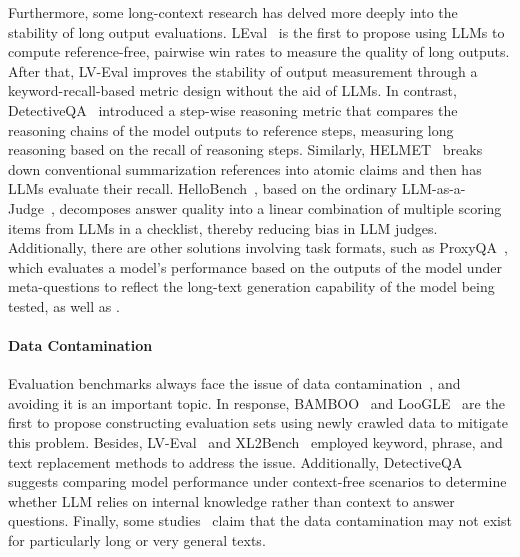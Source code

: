 Furthermore, some long-context research has delved more deeply into the stability of long output evaluations. LEval~\citep{an2023eval} is the first to propose using LLMs to compute reference-free, pairwise win rates to measure the quality of long outputs. After that, LV-Eval\cite{yuan2024lv} improves the stability of output measurement through a keyword-recall-based metric design without the aid of LLMs. In contrast, DetectiveQA~\citep{xu2024detectiveqa} introduced a step-wise reasoning metric that compares the reasoning chains of the model outputs to reference steps, measuring long reasoning based on the recall of reasoning steps. Similarly, HELMET~\citep{yen2024helmet} breaks down conventional summarization references into atomic claims and then has LLMs evaluate their recall. HelloBench~\citep{que2024hellobench}, based on the ordinary LLM-as-a-Judge~\citep{zheng2023judging}, decomposes answer quality into a linear combination of multiple scoring items from LLMs in a checklist, thereby reducing bias in LLM judges. Additionally, there are other solutions involving task formats, such as ProxyQA~\citep{tan2024proxyqa}, which evaluates a model's performance based on the outputs of the model under meta-questions to reflect the long-text generation capability of the model being tested, as well as \citet{liu2024longgenbench}.

\paragraph{Data Contamination} Evaluation benchmarks always face the issue of data contamination~\citep{golchintime}, and avoiding it is an important topic. In response, BAMBOO~\citep{dong2024bamboo} and LooGLE~\citep{li2023loogle} are the first to propose constructing evaluation sets using newly crawled data to mitigate this problem. Besides, LV-Eval~\citep{yuan2024lv} and XL2Bench~\citep{ni2024xl} employed keyword, phrase, and text replacement methods to address the issue. Additionally, DetectiveQA~\citep{xu2024detectiveqa} suggests comparing model performance under context-free scenarios to determine whether LLM relies on internal knowledge rather than context to answer questions. Finally, some studies~\citep{wang2024leave,kuratov2024babilong} claim that the data contamination may not exist for particularly long or very general texts.

